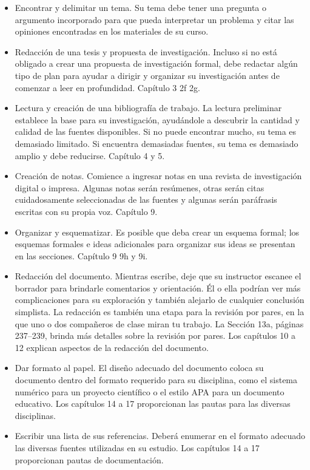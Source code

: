 \begin{itemize}
    \item  Encontrar y delimitar un tema. Su tema debe tener una pregunta o argumento incorporado para que pueda interpretar un problema y citar las opiniones encontradas en los materiales de su curso.
    \item  Redacción de una tesis y propuesta de investigación. Incluso si no está obligado a crear una propuesta de investigación formal, debe redactar algún tipo de plan para ayudar a dirigir y organizar su investigación antes de comenzar a leer en profundidad. Capítulo 3 2f 2g.
    \item Lectura y creación de una bibliografía de trabajo. La lectura preliminar establece la base para su investigación, ayudándole a descubrir la cantidad y calidad de las fuentes disponibles. Si no puede encontrar mucho, su tema es demasiado limitado. Si encuentra demasiadas fuentes, su tema es demasiado amplio y debe reducirse. Capítulo 4 y 5.
    \item  Creación de notas. Comience a ingresar notas en una revista de investigación digital o impresa. Algunas notas serán resúmenes, otras serán citas cuidadosamente seleccionadas de las fuentes y algunas serán paráfrasis escritas con su propia voz. Capítulo 9.
    \item  Organizar y esquematizar. Es posible que deba crear un esquema formal; los esquemas formales e ideas adicionales para organizar sus ideas se presentan en las secciones. Capítulo 9 9h y 9i.
    \item  Redacción del documento. Mientras escribe, deje que su instructor escanee el borrador para brindarle comentarios y orientación. Él o ella podrían ver más complicaciones para su exploración y también alejarlo de cualquier conclusión simplista. La redacción es también una etapa para la revisión por pares, en la que uno o dos compañeros de clase miran tu trabajo. La Sección 13a, páginas 237–239, brinda más detalles sobre la revisión por pares. Los capítulos 10 a 12 explican aspectos de la redacción del documento. 
    \item  Dar formato al papel. El diseño adecuado del documento coloca su documento dentro del formato requerido para su disciplina, como el sistema numérico para un proyecto científico o el estilo APA para un documento educativo. Los capítulos 14 a 17 proporcionan las pautas para las diversas disciplinas. 
    \item  Escribir una lista de sus referencias. Deberá enumerar en el formato adecuado las diversas fuentes utilizadas en su estudio. Los capítulos 14 a 17 proporcionan pautas de documentación.

\end{itemize}
